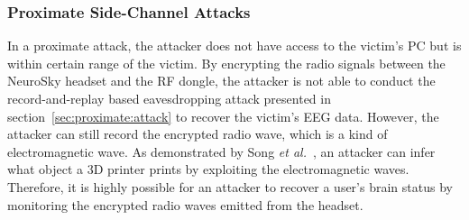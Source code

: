 \subsubsection{Proximate Side-Channel Attacks}
In a proximate attack, the attacker does not have access to the victim's PC but is within certain range of the victim. By encrypting the radio signals between the NeuroSky headset and the RF dongle, the attacker is not able to conduct the record-and-replay based eavesdropping attack presented in section~\ref{sec:proximate:attack} to recover the victim's EEG data. However, the attacker can still record the encrypted radio wave, which is a kind of electromagnetic wave. As demonstrated by Song \emph{et al.}~\cite{song2016my}, an attacker can infer what object a 3D printer prints by exploiting the electromagnetic waves. Therefore, it is highly possible for an attacker to recover a user's brain status by monitoring the encrypted radio waves emitted from the headset.
